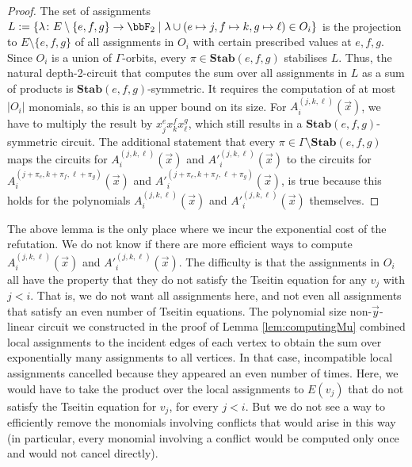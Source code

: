 \documentclass[10pt,a4paper]{article}
\newcommand{\Stab}{\mathbf{Stab}}
\begin{document}
\begin{proof}
	The set of assignments $L := \{\lambda \colon E \setminus \{e,f,g\} \to \bbF_2 \mid \lambda \cup (e \mapsto j, f \mapsto k, g \mapsto \ell) \in O_i  \}$ is the projection to $E \setminus \{e,f,g\}$ of all assignments in $O_i$ with certain prescribed values at $e,f,g$.
	Since $O_i$ is a union of $\Gamma$-orbits, every $\pi \in \Stab(e,f,g)$ stabilises $L$. Thus, the natural depth-2-circuit that computes the sum over all assignments in $L$ as a sum of products is $\Stab(e,f,g)$-symmetric. It requires the computation of at most $|O_i|$ monomials, so this is an upper bound on its size.
	For $A^{(j,k,\ell)}_i(\vec x)$, we have to multiply the result by $x^{e}_jx^f_kx^g_\ell$, which still results in a $\Stab(e,f,g)$-symmetric circuit. The additional statement that  every $\pi \in \Gamma \setminus \Stab(e,f,g)$ maps the circuits for $A^{(j,k,\ell)}_i(\vec x)$ and $A'^{(j,k,\ell)}_i(\vec x)$ to the circuits for $A^{(j+\pi_e,k+\pi_f,\ell+\pi_g)}_i(\vec x)$ and $A'^{(j+\pi_e,k+\pi_f,\ell+\pi_g)}_i(\vec x)$, is true because this holds for the polynomials  $A^{(j,k,\ell)}_i(\vec x)$ and $A'^{(j,k,\ell)}_i(\vec x)$ themselves. 
\end{proof}	

The above lemma is the only place where we incur the exponential cost of the refutation. 
We do not know if there are more efficient ways to compute $A^{(j,k,\ell)}_i(\vec x)$ and $A'^{(j,k,\ell)}_i(\vec x)$. 
The difficulty is that the assignments in $O_i$ all have the property that they do not satisfy the Tseitin equation for any $v_j$ with $j < i$. That is, we do not want all assignments here, and not even all assignments that satisfy an even number of Tseitin equations. The polynomial size non-$\vec y$-linear circuit we constructed in the proof of Lemma \ref{lem:computingMu} combined local assignments to the incident edges of each vertex to obtain the sum over exponentially many assignments to all vertices. In that case, incompatible local assignments cancelled because they appeared an even number of times. Here, we would have to take the product over the local assignments to $E(v_j)$ that do not satisfy the Tseitin equation for $v_j$, for every $j < i$. But we do not see a way to efficiently remove the monomials involving conflicts that would arise in this way (in particular, every monomial involving a conflict would be computed only once and would not cancel directly).\\
\end{document}
